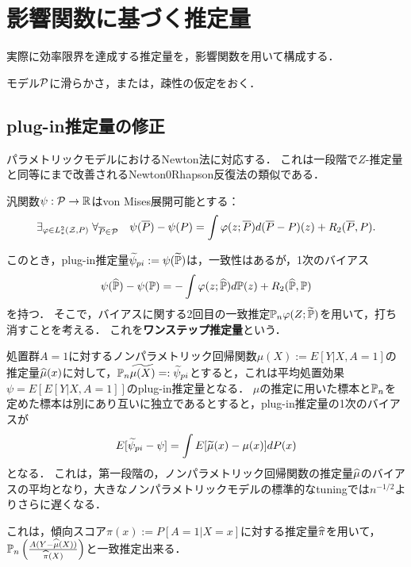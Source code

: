 \documentclass[uplatex,dvipdfmx]{jsreport}
\renewcommand{\Z}{\mathcal{Z}}
\begin{document}
\section{影響関数に基づく推定量}

\begin{tcolorbox}[colframe=ForestGreen, colback=ForestGreen!10!white,breakable,colbacktitle=ForestGreen!40!white,coltitle=black,fonttitle=\bfseries\sffamily,
title=]
    実際に効率限界を達成する推定量を，影響関数を用いて構成する．
\end{tcolorbox}

\begin{notation}
    モデル$\P$に滑らかさ，または，疎性の仮定をおく．
\end{notation}

\subsection{plug-in推定量の修正}

\begin{tcolorbox}[colframe=ForestGreen, colback=ForestGreen!10!white,breakable,colbacktitle=ForestGreen!40!white,coltitle=black,fonttitle=\bfseries\sffamily,
title=]
    パラメトリックモデルにおけるNewton法に対応する．
    これは一段階で$Z$-推定量と同等にまで改善されるNewton0Rhapson反復法の類似である．
\end{tcolorbox}

\begin{notation}
    汎関数$\psi:\P\to\R$はvon Mises展開可能とする：
    \[\exists_{\varphi\in L^2_*(\Z,P)}\;\forall_{\o{P}\in\P}\quad\psi(\o{P})-\psi(P)=\int\varphi(z;\o{P})d(\o{P}-P)(z)+R_2(\o{P},P).\]
\end{notation}

\begin{discussion}
    このとき，plug-in推定量$\wt{\psi}_{pi}:=\psi(\wt{\bP})$は，一致性はあるが，1次のバイアス
    \[\psi(\wh{\bP})-\psi(\bP)=-\int\varphi(z;\wh{\bP})d\bP(z)+R_2(\wh{\bP},\bP)\]
    を持つ．
    そこで，バイアスに関する2回目の一致推定$\bP_n\varphi(Z;\wt{\bP})$を用いて，打ち消すことを考える．
    これを\textbf{ワンステップ推定量}という．
\end{discussion}

\begin{example}
    処置群$A=1$に対するノンパラメトリック回帰関数$\mu(X):=E[Y|X,A=1]$の推定量$\wh{\mu}(x)$に対して，$\bP_n\wt{\mu(X)}=:\wt{\psi}_{pi}$とすると，これは平均処置効果$\psi=E[E[Y|X,A=1]]$のplug-in推定量となる．
    $\mu$の推定に用いた標本と$\bP_n$を定めた標本は別にあり互いに独立であるとすると，plug-in推定量の1次のバイアスが
    \[E[\wt{\psi}_{pi}-\psi]=\int E[\wt{\mu}(x)-\mu(x)]dP(x)\]
    となる．
    これは，第一段階の，ノンパラメトリック回帰関数の推定量$\wh{\mu}$のバイアスの平均となり，大きなノンパラメトリックモデルの標準的なtuningでは$n^{-1/2}$よりさらに遅くなる．

    これは，傾向スコア$\pi(x):=P[A=1|X=x]$に対する推定量$\wh{\pi}$を用いて，$\bP_n\paren{\frac{A(Y-\wh{\mu}(X))}{\wh{\pi}(X)}}$と一致推定出来る．
\end{example}
\end{document}
